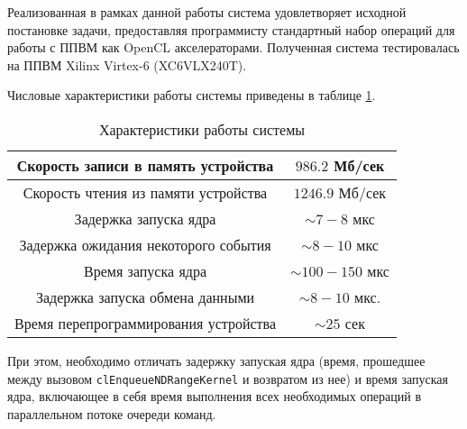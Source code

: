Реализованная в рамках данной работы система удовлетворяет исходной постановке
задачи, предоставляя программисту стандартный набор операций для работы с ППВМ
как OpenCL акселераторами. Полученная система тестировалась на ППВМ Xilinx
Virtex-6 (XC6VLX240T)\cite{virtex-6-overview}.

Числовые характеристики работы системы приведены в таблице \ref{results-table}.
\begin{table}[h!]
\caption{Характеристики работы системы}
\begin{center}
\begin{tabular}{|c|c|}
\hline
Скорость записи в память устройства & $986.2$ Мб/сек \\ \hline
Скорость чтения из памяти устройства & $1246.9$ Мб/сек \\ \hline
Задержка запуска ядра & $\sim 7-8$ мкс \\ \hline
Задержка ожидания некоторого события & $\sim 8-10$ мкс \\ \hline
Время запуска ядра & $\sim 100-150$ мкс \\ \hline
Задержка запуска обмена данными & $\sim 8-10$ мкс. \\ \hline
Время перепрограммирования устройства & $\sim 25$ сек \\\hline
\end{tabular}
\end{center}
\label{results-table}
\end{table}

При этом, необходимо отличать задержку запуская ядра (время, прошедшее между
вызовом \texttt{clEnqueueNDRangeKernel} и возвратом из нее) и время запуская
ядра, включающее в себя время выполнения всех необходимых операций в
параллельном потоке очереди команд.